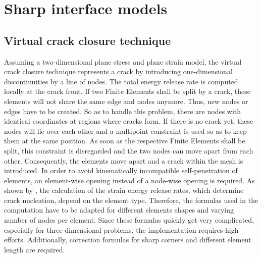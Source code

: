 \appendix

\section{Sharp interface models} \label{appsec:sharp}

\subsection{Virtual crack closure technique} \label{appsec:virtClos}
Assuming a two-dimensional plane stress and plane strain model, the virtual crack closure technique represents a crack by introducing one-dimensional discontinuities by a line of nodes. The total energy release rate is computed locally at the crack front. If two Finite Elements shall be split by a crack, these elements will not share the same edge and nodes anymore. Thus, new nodes or edges have to be created. So as to handle this problem, there are nodes with identical coordinates at regions where cracks form. If there is no crack yet, these nodes will lie over each other and a multipoint constraint is used so as to keep them at the same position. As soon as the respective Finite Elements shall be split, this constraint is disregarded and the two nodes can move apart from each other. Consequently, the elements move apart and a crack within the mesh is introduced. In order to avoid kinematically incompatible self-penetration of elements, an element-wise opening instead of a node-wise opening is required. As shown by \citet{03_SotA_virtClos}, the calculation of the strain energy release rates, which determine crack nucleation, depend on the element type. Therefore, the formulas used in the computation have to be adapted for different elements shapes and varying number of nodes per element. Since these formulas quickly get very complicated, especially for three-dimensional problems, the implementation requires high efforts. Additionally, correction formulas for sharp corners and different element length are required. \cite{03_SotA_virtClos} 

